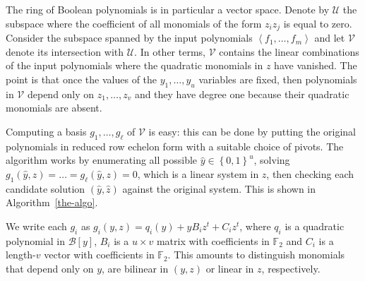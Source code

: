 \documentclass[a4paper,UKenglish,cleveref, autoref]{lipics-v2019}
\newcommand{\bits}{\left\{0, 1\right\}}
\newcommand{\red}{\color{red}}
\newcommand{\TODO}[1]{{\red \textbf{TODO}:} #1\xspace}
\begin{document}
  
  The ring of Boolean polynomials is in particular a vector space. Denote by
  $\mathcal{U}$ the subspace where the coefficient of all monomials of the form
  $z_i z_j$ is equal to zero. Consider the subspace spanned by the input
  polynomials $\left\langle f_1, \dots, f_m\right\rangle$ and let $\mathcal{V}$
  denote its intersection with $\mathcal{U}$. In other terms, $\mathcal{V}$
  contains the linear combinations of the input polynomials where the quadratic
  monomials in $z$ have vanished. The point is that once the values of the
  $y_1, \dots, y_u$ variables are fixed, then polynomials in $\mathcal{V}$ depend
  only on $z_1, \dots, z_v$ and they have degree one because their quadratic
  monomials are absent.
  
  Computing a basis $g_1, \dots, g_\ell$ of $\mathcal{V}$ is easy: this can be
  done by putting the original polynomials in reduced row echelon form with a
  suitable choice of pivots. The algorithm works by enumerating all possible
  $\hat y \in \bits^u$, solving $g_1(\hat y, z) = \dots = g_\ell(\hat y, z) = 0$,
  which is a linear system in $z$, then checking each candidate solution
  $(\hat y, \hat z)$ against the original system. This is shown in
  Algorithm~\ref{the-algo}.
  
  We write each $g_i$ as $g_i(y, z) = q_i(y) + y B_i z^t + C_i z^t$, where $q_i$
  is a quadratic polynomial in $\mathcal{B}[y]$, $B_i$ is a $u \times v$ matrix
  with coefficients in $\mathbb{F}_2$ and $C_i$ is a length-$v$ vector with
  coefficients in $\mathbb{F}_2$. This amounts to distinguish monomials that
  depend only on $y$, are bilinear in $(y, z)$ or linear in $z$, respectively.
  
\end{document}
